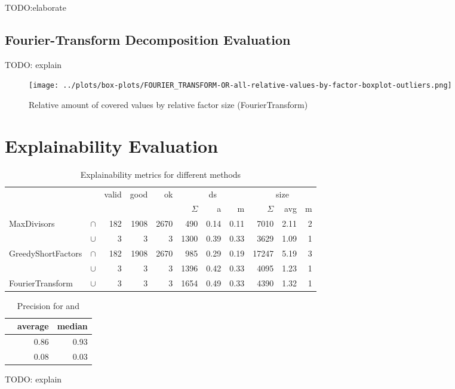 TODO:elaborate

\newpage
\subsection{Fourier-Transform Decomposition Evaluation}
TODO: explain
\begin{figure}[h]
	\texttt{[image: ../plots/box-plots/FOURIER\_TRANSFORM-OR-all-relative-values-by-factor-boxplot-outliers.png]}
	\caption{Relative amount of covered values by relative factor size (FourierTransform)}
	\label{fig:eval:fourier-all-factors-box-plot}
\end{figure}

\newpage
\newpage
\section{Explainability Evaluation}
\begin{table}[h]
	\begin{tabular}{ll|rrrrrr|rrr}
		& & valid & good & ok &  \multicolumn{3}{c}{ds} & \multicolumn{3}{c}{size}  \\
		& & & & & $\Sigma$ & a & m & $\Sigma$ & avg & m\\
		\hline
		\multirow{2}{*}{MaxDivisors} & $\cap$ & 182 & 1908 & 2670 & 490 & 0.14 & 0.11 & 7010 & 2.11 & 2 \\
		 & $\cup$ & 3 & 3 & 3 & 1300 & 0.39 & 0.33 & 3629 & 1.09 & 1 \\
		 \hline
		\multirow{2}{*}{GreedyShortFactors} & $\cap$ & 182 & 1908 & 2670 & 985 & 0.29 & 0.19 & 17247 & 5.19 & 3 \\
		& $\cup$ & 3 & 3 & 3 & 1396 & 0.42 & 0.33 & 4095 & 1.23 & 1 \\
		\hline
		FourierTransform & $\cup$ & 3 & 3 & 3 & 1654 & 0.49 & 0.33 & 4390 & 1.32 & 1 \\
	\end{tabular}
	\caption{Explainability metrics for different methods}
	\label{tab:eval-metric}
\end{table}

\begin{table}[h]
	\centering
	\begin{tabular}{l|rr}
		 & average & median \\
		 \hline
		 \andDecomp & 0.86 & 0.93 \\
		 \orDecomp & 0.08 & 0.03 \\
	\end{tabular}
	\caption{Precision for \andDecomp and \orDecomp}
	\label{tab:eval-precision}
\end{table}

TODO: explain

